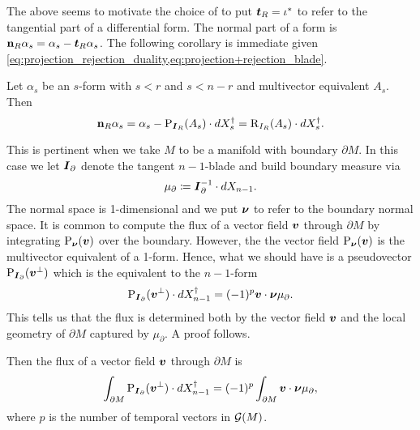 The above seems to motivate the choice of \cite{schwarz_hodge_1995} to put $\boldsymbol{t}_R = \iota^*$ to refer to the tangential part of a differential form. The normal part of a form is $\mathbf{n}_R \alpha_s = \alpha_s - \boldsymbol{t}_R \alpha_s$. The following corollary is immediate given \cref{eq:projection_rejection_duality,eq:projection+rejection_blade}. 
\begin{corollary}
Let $\alpha_s$ be an $s$-form with $s<r$ and $s<n-r$ and multivector equivalent $A_s$. Then
\begin{equation}
\mathbf{n}_R \alpha_s = \alpha_s - \operatorname{P}_{\boldsymbol{I}_R}(A_s)\cdot dX_s^\dagger = \operatorname{R}_{I_R}(A_s)\cdot dX_s^\dagger.
\end{equation}
\end{corollary}

This is pertinent when we take $M$ to be a manifold with boundary $\partial M$. In this case we let $\boldsymbol{I}_\partial$ denote the tangent $n-1$-blade and build boundary measure via
\begin{equation}
\mu_\partial \coloneqq \boldsymbol{I}_\partial^{-1} \cdot dX_{n-1}.
\end{equation}
The normal space is 1-dimensional and we put $\boldsymbol{\nu}$ to refer to the boundary normal space. It is common to compute the flux of a vector field $\boldsymbol{v}$ through $\partial M$ by integrating $\operatorname{P}_{\boldsymbol{\nu}}(\boldsymbol{v})$ over the boundary. However, the the vector field $\operatorname{P}_{\boldsymbol{\nu}}(\boldsymbol{v})$ is the multivector equivalent of a 1-form. Hence, what we should have is a pseudovector $\operatorname{P}_{\boldsymbol{I}_\partial}(\boldsymbol{v}^\perp)$ which is the equivalent to the $n-1$-form
\begin{equation}
\operatorname{P}_{\boldsymbol{I}_\partial}(\boldsymbol{v}^\perp) \cdot dX_{n-1}^\dagger = (-1)^p \boldsymbol{v}\cdot \boldsymbol{\nu} \mu_\partial.
\end{equation}
This tells us that the flux is determined both by the vector field $\boldsymbol{v}$ and the local geometry of $\partial M$ captured by $\mu_\partial$. A proof follows. 
\begin{proposition}
\label{prop:flux}
Then the flux of a vector field $\boldsymbol{v}$ through $\partial M$ is
\begin{equation}
\int_{\partial M} \operatorname{P}_{\boldsymbol{I}_\partial}(\boldsymbol{v}^\perp) \cdot dX_{n-1}^\dagger = (-1)^p\int_{\partial M} \boldsymbol{v} \cdot \boldsymbol{\nu} \mu_\partial,
\end{equation}
where $p$ is the number of temporal vectors in $\mathcal{G}(M)$.
\end{proposition}
